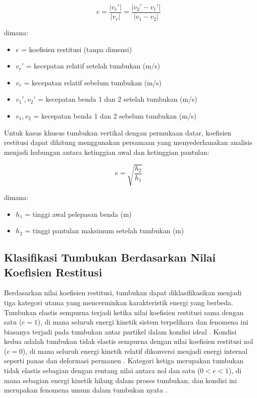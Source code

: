 \begin{equation}
    e = \frac{|v_{r}'|}{|v_{r}|} = \frac{|v_2' - v_1'|}{|v_1 - v_2|}
\end{equation}

dimana:
\begin{itemize}
    \item $e$ = koefisien restitusi (tanpa dimensi)
    \item $v_{r}'$ = kecepatan relatif setelah tumbukan (m/s)
    \item $v_{r}$ = kecepatan relatif sebelum tumbukan (m/s)
    \item $v_1', v_2'$ = kecepatan benda 1 dan 2 setelah tumbukan (m/s)
    \item $v_1, v_2$ = kecepatan benda 1 dan 2 sebelum tumbukan (m/s)
\end{itemize}

Untuk kasus khusus tumbukan vertikal dengan permukaan datar, koefisien restitusi dapat dihitung menggunakan persamaan yang menyederhanakan analisis menjadi hubungan antara ketinggian awal dan ketinggian pantulan:

\begin{equation}
    e = \sqrt{\frac{h_2}{h_1}}
\end{equation}

dimana:
\begin{itemize}
    \item $h_1$ = tinggi awal pelepasan benda (m)
    \item $h_2$ = tinggi pantulan maksimum setelah tumbukan (m)
\end{itemize}

\subsection{Klasifikasi Tumbukan Berdasarkan Nilai Koefisien Restitusi}
Berdasarkan nilai koefisien restitusi, tumbukan dapat diklasifikasikan menjadi tiga kategori utama yang mencerminkan karakteristik energi yang berbeda. Tumbukan elastis sempurna terjadi ketika nilai koefisien restitusi sama dengan satu ($e = 1$), di mana seluruh energi kinetik sistem terpelihara dan fenomena ini biasanya terjadi pada tumbukan antar partikel dalam kondisi ideal \citep{stronge2018impact}. Kondisi kedua adalah tumbukan tidak elastis sempurna dengan nilai koefisien restitusi nol ($e = 0$), di mana seluruh energi kinetik relatif dikonversi menjadi energi internal seperti panas dan deformasi permanen \citep{johnson1987contact}. Kategori ketiga merupakan tumbukan tidak elastis sebagian dengan rentang nilai antara nol dan satu ($0 < e < 1$), di mana sebagian energi kinetik hilang dalam proses tumbukan, dan kondisi ini merupakan fenomena umum dalam tumbukan nyata \citep{cross2002coefficient}.

